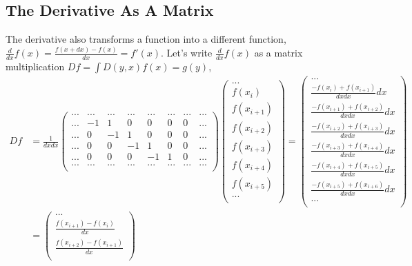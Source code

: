 \documentclass[12pt]{article}
\begin{document}
\subsection{The Derivative As A Matrix}
The derivative also transforms a function into a different function, $\frac{d}{dx}f(x) = \frac{f(x+dx) - f(x)}{dx} = f'(x)$. Let's write $\frac{d}{dx}f(x)$ as a matrix multiplication $Df = \int D(y,x)f(x) = g(y)$,
\begin{equation}
\begin{split}
Df &= \frac{1}{dxdx} 
\begin{pmatrix}
... & ... & ... & ... & ... & ... & ... & ... \\
... & -1 & 1 & 0 & 0 & 0 & 0 & ...\\
... & 0 & -1 & 1 & 0 & 0 & 0 & ... \\
... & 0 & 0 & -1 & 1 & 0 & 0 & ... \\
... & 0 & 0 & 0 & -1 & 1 & 0 & ... \\
... & ... & ... & ... & ... & ... & ... & ... \\
\end{pmatrix}
\begin{pmatrix}
... \\
f(x_i) \\
f(x_{i+1}) \\
f(x_{i+2}) \\
f(x_{i+3}) \\
f(x_{i+4}) \\
f(x_{i+5}) \\
... \\
\end{pmatrix}
=
\begin{pmatrix}
... \\
\frac{-f(x_i) + f(x_{i+1})}{dxdx}dx \\
\frac{-f(x_{i+1}) + f(x_{i+2})}{dxdx}dx \\
\frac{-f(x_{i+2}) + f(x_{i+3})}{dxdx}dx \\
\frac{-f(x_{i+3}) + f(x_{i+4})}{dxdx}dx \\
\frac{-f(x_{i+4}) + f(x_{i+5})}{dxdx}dx \\
\frac{-f(x_{i+5}) + f(x_{i+6})}{dxdx}dx \\
... \\
\end{pmatrix}\\
&=
\begin{pmatrix}
... \\
\frac{f(x_{i+1}) - f(x_i) }{dx} \\
\frac{f(x_{i+2}) - f(x_{i+1})}{dx} \\

\end{pmatrix}
\end{split}
\end{equation}
\end{document}
